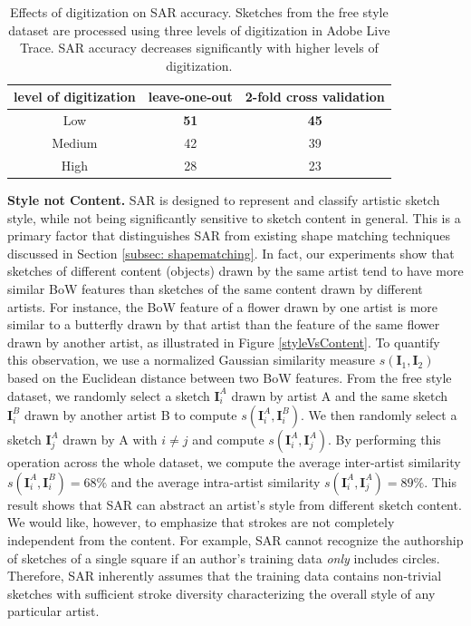 \vspace{-1mm}
\begin{table}[!htbp]
\caption {Effects of digitization on SAR accuracy. Sketches from the free style dataset are processed using three levels of digitization in Adobe Live Trace. SAR accuracy decreases significantly with higher levels of digitization.}
\label{table:digitization}
\vspace{-2mm}
\centering
\small
\begin{tabular}{c | c | c}
level of digitization& leave-one-out & 2-fold cross validation \\ \hline

Low       & \textbf{51} &  \textbf{45}\\
Medium       & 42 &  39\\
High      & 28 &  23\\
\end{tabular}\vspace{0mm}
\end{table}


\noindent\textbf{Style not Content.} SAR is designed to represent and classify artistic sketch style, while not being significantly sensitive to sketch content in general. This is a primary factor that distinguishes SAR from existing shape matching techniques discussed in Section \ref{subsec: shapematching}. In fact, our experiments show that sketches of different content (objects) drawn by the same artist tend to have more similar BoW features than sketches of the same content drawn by different artists. For instance, the BoW feature of a flower drawn by one artist is more similar to a butterfly drawn by that artist than the feature of the same flower drawn by another artist, as illustrated in Figure \ref{styleVsContent}. To quantify this observation, we use a normalized Gaussian similarity measure $s(\mathbf{I}_1,\mathbf{I}_2)$ based on the Euclidean distance between two BoW features. From the free style dataset, we randomly select a sketch $\mathbf{I}_i^A$ drawn by artist A and the same sketch $\mathbf{I}_i^B$  drawn by another artist B to compute $s(\mathbf{I}_i^A,\mathbf{I}_i^B)$. We then randomly select a sketch $\mathbf{I}_j^A$ drawn by A with $i\neq j$ and compute $s(\mathbf{I}_i^A,\mathbf{I}_j^A)$. By performing this operation across the whole dataset, we compute the average inter-artist similarity $s(\mathbf{I}_i^A,\mathbf{I}_i^B)=68\%$ and the average intra-artist similarity $s(\mathbf{I}_i^A,\mathbf{I}_j^A)=89\%$. This result shows that SAR can abstract an artist's style from different sketch content. We would like, however, to emphasize that strokes are not completely independent from the content. For example, SAR cannot recognize the authorship of sketches of a single square if an author's training data \emph{only} includes circles. Therefore, SAR inherently assumes that the training data contains non-trivial sketches with sufficient stroke diversity characterizing the overall style of any particular artist.



